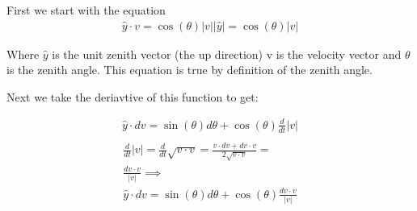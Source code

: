 \documentclass[12pt]{amsart}
\theoremstyle{definition}
\theoremstyle{definition}
\begin{document}
First we start with the equation
\begin{eqnarray}
  \hat y\cdot v=\cos(\theta)|v||\hat y|=\cos(\theta)|v|
\end{eqnarray}

Where $\hat y$ is the unit zenith vector (the up direction) v is the velocity
vector and $\theta$ is the zenith angle.
This equation is true by definition of the zenith angle.

Next we take the deriavtive of this function to get:

\begin{eqnarray}
  \hat y\cdot dv=\sin(\theta)d\theta+\cos(\theta)\frac{d}{dt}|v|\\
\end{eqnarray}
\begin{eqnarray}
  \frac{d}{dt}|v|=
  \frac{d}{dt}\sqrt{v\cdot v}=
  \frac{v\cdot dv+dv\cdot v}{2\sqrt{v\cdot v}}=\\
  \frac{dv\cdot v}{|v|}\implies\\
  \hat y\cdot dv=\sin(\theta)d\theta+\cos(\theta)\frac{dv\cdot v}{|v|}
\end{eqnarray}
\end{document}
